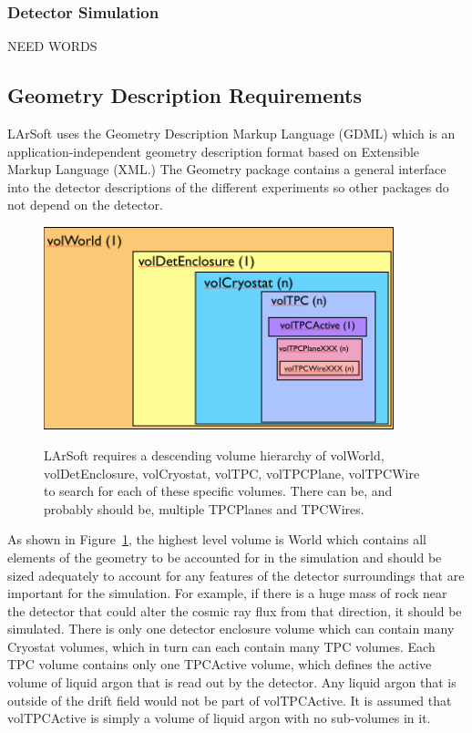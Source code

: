 \documentclass[12pt]{elsarticle}
\begin{document}
\subsubsection{Detector Simulation}
NEED WORDS

\subsection{Geometry Description Requirements}
LArSoft uses the Geometry Description Markup Language (GDML) which is an application-independent geometry description format based on Extensible Markup Language (XML.) 
The Geometry package contains a general interface into the detector descriptions of the different experiments so other packages do not depend on the detector. 

\begin{figure}[h]
\center
\caption{LArSoft requires a descending volume hierarchy of volWorld, volDetEnclosure, volCryostat, volTPC, volTPCPlane, volTPCWire to search for each of these specific volumes. There can be, and probably should be, multiple TPCPlanes and TPCWires.}
\includegraphics[width=4.0in]{./mtrls/imgs/geometry_volumes.png}
\label{geo-vol.img}
\end{figure}

As shown in Figure~\ref{geo-vol.img},
the highest level volume is World which contains all elements of the geometry to be accounted for in the simulation and should be sized adequately to account for any features of the detector surroundings that are important for the simulation. For example, if there is a huge mass of rock near the detector that could alter the cosmic ray flux from that direction, it should be simulated. There is only one detector enclosure volume which can contain many Cryostat volumes, which in turn can each contain many TPC volumes. Each TPC volume contains only one TPCActive volume, which defines the active volume of liquid argon that is read out by the detector. Any liquid argon that is outside of the drift field would not be part of volTPCActive. It is assumed that volTPCActive is simply a volume of liquid argon with no sub-volumes in it. 
\end{document}
